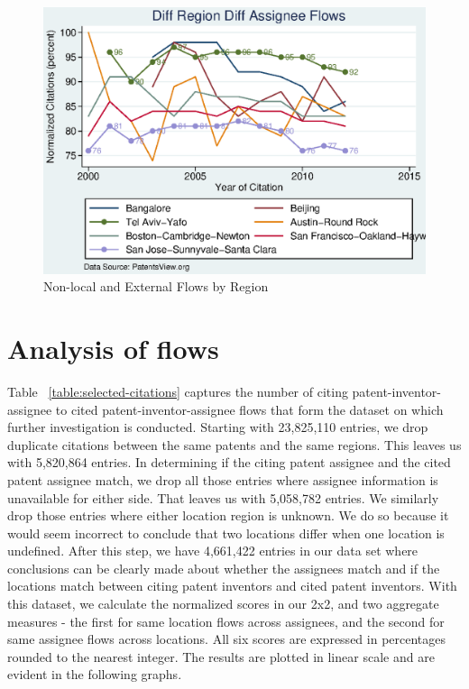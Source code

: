 \documentclass[12pt]{article}
\begin{document}
\begin{figure}[h]
\begin{centering}
  \includegraphics[width=\textwidth]{DiffRegionDiffAssigneeFlows}
  \caption{Non-local and External Flows by Region}
  \label{fig:DiffRegionDiffAssigneeFlows}
\end{centering}
\end{figure}

\section{Analysis of flows}\label{S:Analysis}
Table ~\ref{table:selected-citations} captures the number of citing patent-inventor-assignee to cited patent-inventor-assignee flows that form the dataset on which further investigation is conducted. Starting with 23,825,110 entries, we drop duplicate citations between the same patents and the same regions. This leaves us with 5,820,864 entries. In determining if the citing patent assignee and the cited patent assignee match, we drop all those entries where assignee information is unavailable for either side. That leaves us with  5,058,782 entries. We similarly drop those entries where either location region is unknown. We do so because it would seem incorrect to conclude that two locations differ when one location is undefined. After this step, we have 4,661,422 entries in our data set where conclusions can be clearly made about whether the assignees match and if the locations match between citing patent inventors and cited patent inventors. With this dataset, we calculate the normalized scores in our 2x2, and two aggregate measures - the first for same location flows across assignees, and the second for same assignee flows across locations. All six scores are expressed in percentages rounded to the nearest integer. The results are plotted in linear scale and are evident in the following graphs.
\newpage
\end{document}
